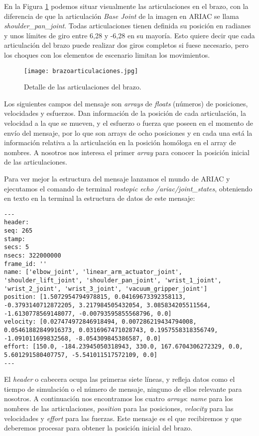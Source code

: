 En la Figura \ref{fig:brazoarticulaciones} podemos situar visualmente las articulaciones en el brazo, con la diferencia de que la articulación \textit{Base Joint} de la imagen en ARIAC se llama \textit{shoulder\_pan\_joint}. Todas articulaciones tienen definida su posición en radianes y unos límites de giro entre 6,28 y -6,28 en su mayoría. Esto quiere decir que cada articulación del brazo puede realizar dos giros completos si fuese necesario, pero los choques con los elementos de escenario limitan los movimientos.

\begin{figure}[]
	\centering\texttt{[image: brazoarticulaciones.jpg]}
	\caption{Detalle de las articulaciones del brazo.}
	\label{fig:brazoarticulaciones}
\end{figure}

Los siguientes campos del mensaje son \textit{arrays} de \textit{floats} (números) de posiciones, velocidades y esfuerzos. Dan información de la posición de cada articulación, la velocidad a la que se mueven, y el esfuerzo o fuerza que poseen en el momento de envío del mensaje, por lo que son arrays de ocho posiciones y en cada una está la información relativa a la articulación en la posición homóloga en el array de nombres. A nosotros nos interesa el primer \textit{array} para conocer la posición inicial de las articulaciones.

Para ver mejor la estructura del mensaje lanzamos el mundo de ARIAC y ejecutamos el comando de terminal \textit{rostopic echo /ariac/joint\_states}, obteniendo en texto en la terminal la estructura de datos de este mensaje:

\begin{lstlisting}
---
header: 
seq: 265
stamp: 
secs: 5
nsecs: 322000000
frame_id: ''
name: ['elbow_joint', 'linear_arm_actuator_joint', 'shoulder_lift_joint', 'shoulder_pan_joint', 'wrist_1_joint', 'wrist_2_joint', 'wrist_3_joint', 'vacuum_gripper_joint']
position: [1.5072954794978815, 0.04169673392358113, -0.3793140712872205, 3.217984505432054, 3.085834205511564, -1.6130778569148077, -0.00793595855568796, 0.0]
velocity: [0.027474972846918494, 0.007286219434794008, 0.05461882849916373, 0.0316967471028743, 0.1957558318356749, -1.091011699832568, -8.054309845386587, 0.0]
effort: [150.0, -184.23945050318943, 330.0, 167.6704306272329, 0.0, 5.601291580407757, -5.541011517572109, 0.0]
---
\end{lstlisting}

El \textit{header} o cabecera ocupa las primeras siete líneas, y refleja datos como el tiempo de simulación o el número de mensaje, ninguno de ellos relevante para nosotros. A continuación nos encontramos los cuatro \textit{arrays}: \textit{name} para los nombres de las articulaciones, \textit{position} para las posiciones, \textit{velocity} para las velocidades y \textit{effort} para las fuerzas. Este mensaje es el que recibiremos y que deberemos procesar para obtener la posición inicial del brazo.

